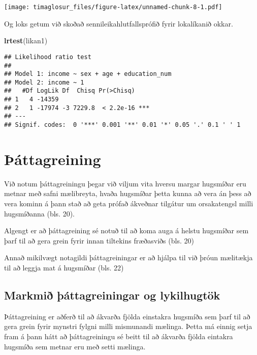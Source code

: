 \documentclass[]{book}
\newenvironment{Shaded}{\begin{snugshade}}{\end{snugshade}}
\newcommand{\KeywordTok}[1]{\textcolor[rgb]{0.13,0.29,0.53}{\textbf{#1}}}
\newcommand{\NormalTok}[1]{#1}
\begin{document}
\texttt{[image: timaglosur\_files/figure-latex/unnamed-chunk-8-1.pdf]}

Og loks getum við skoðað sennileikahlutfallsprófið fyrir lokalíkanið okkar.

\begin{Shaded}
\begin{Highlighting}[]
\KeywordTok{lrtest}\NormalTok{(likan1)}
\end{Highlighting}
\end{Shaded}

\begin{verbatim}
## Likelihood ratio test
## 
## Model 1: income ~ sex + age + education_num
## Model 2: income ~ 1
##   #Df LogLik Df  Chisq Pr(>Chisq)    
## 1   4 -14359                         
## 2   1 -17974 -3 7229.8  < 2.2e-16 ***
## ---
## Signif. codes:  0 '***' 0.001 '**' 0.01 '*' 0.05 '.' 0.1 ' ' 1
\end{verbatim}

\hypertarget{uxfeuxe1ttagreining}{%
\chapter{Þáttagreining}\label{uxfeuxe1ttagreining}}

Við notum þáttagreiningu þegar við viljum vita hversu margar hugsmíðar eru metnar með safni mælibreyta, hvaða hugsmíðar þetta kunna að vera án þess að vera kominn á þann stað að geta prófað ákveðnar tilgátur um orsakatengsl milli hugsmíðanna (bls. 20).

Algengt er að þáttagreining sé notuð til að koma auga á helstu hugsmíðar sem þarf til að gera grein fyrir innan tiltekins fræðasviðs (bls. 20)

Annað mikilvægt notagildi þáttagreiningar er að hjálpa til við þróun mælitækja til að leggja mat á hugsmíðar (bls. 22)

\hypertarget{markmiuxf0-uxfeuxe1ttagreiningar-og-lykilhugtuxf6k}{%
\section{Markmið þáttagreiningar og lykilhugtök}\label{markmiuxf0-uxfeuxe1ttagreiningar-og-lykilhugtuxf6k}}

Þáttagreining er aðferð til að ákvarða fjölda einstakra hugsmíða sem þarf til að gera grein fyrir mynstri fylgni milli mismunandi mælinga. Þetta má einnig setja fram á þann hátt að þáttagreiningu sé beitt til að ákvarða fjölda eintakra hugsmíða sem metnar eru með setti mælinga.
\end{document}
